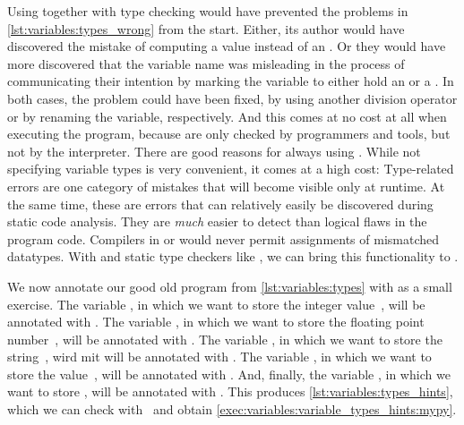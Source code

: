Using  together with type checking would have prevented the problems in \cref{lst:variables:types_wrong} from the start.
Either, its author would have discovered the mistake of computing a  value instead of an .
Or they would have more discovered that the variable name was misleading in the process of communicating their intention by marking the variable to either hold an  or a .
In both cases, the problem could have been fixed, by using another division operator or by renaming the variable, respectively.
And this comes at no cost at all when executing the program, because  are only checked by programmers and tools, but not by the interpreter.%
%
%
%
There are good reasons for always using .
While not specifying variable types is very convenient, it comes at a high cost:%
%
%
%
Type-related errors are one category of mistakes that will become visible only at runtime.
At the same time, these are errors that can relatively easily be discovered during static code analysis.
They are \emph{much} easier to detect than logical flaws in the program code.
Compilers in  or  would never permit assignments of mismatched datatypes.
With  and static type checkers like \mypy, we can bring this functionality to \python.%
%
%
%
%
%

We now annotate our good old program  from \cref{lst:variables:types} with  as a small exercise.
The variable , in which we want to store the integer value~, will be annotated with .
The variable , in which we want to store the floating point number~, will be annotated with .
The variable , in which we want to store the string~, wird mit will be annotated with .
The variable , in which we want to store the value~, will be annotated with .
And, finally, the variable , in which we want to store , will be annotated with .
This produces \cref{lst:variables:types_hints}, which we can check with \mypy\ and obtain \cref{exec:variables:variable_types_hints:mypy}.

